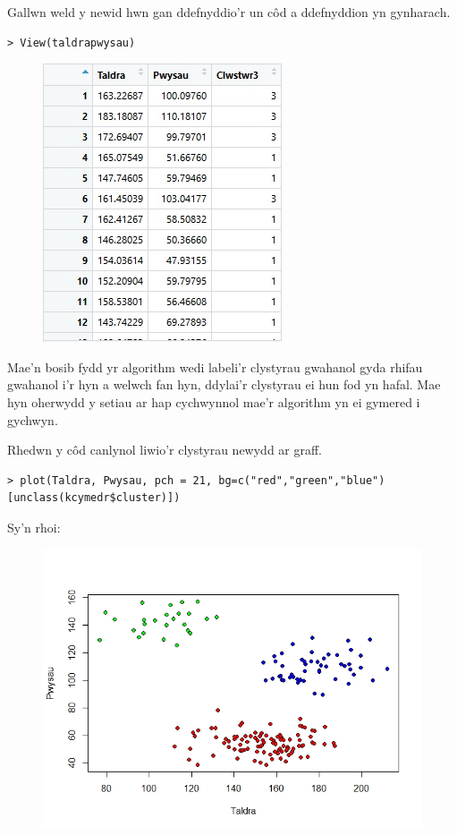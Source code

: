 Gallwn weld y newid hwn gan ddefnyddio'r un c\^{o}d a ddefnyddion yn gynharach.

\begin{verbatim}
> View(taldrapwysau)
\end{verbatim}

\begin{figure}[H]
\begin{center}
\includegraphics[width=0.5\linewidth]{../img/Data3_yn_R.jpg}
\end{center}
\end{figure}

Mae'n bosib fydd yr algorithm wedi labeli'r clystyrau gwahanol gyda rhifau gwahanol i'r hyn a welwch fan hyn, ddylai'r clystyrau ei hun fod yn hafal. Mae hyn oherwydd y setiau ar hap cychwynnol mae'r algorithm yn ei gymered i gychwyn.

Rhedwn y c\^{o}d canlynol liwio'r clystyrau newydd ar graff.

\begin{verbatim}
> plot(Taldra, Pwysau, pch = 21, bg=c("red","green","blue")[unclass(kcymedr$cluster)])
\end{verbatim}

Sy'n rhoi:

\begin{figure}[H]
\begin{center}
\includegraphics[width=0.5\linewidth]{../img/3clwstwrR.jpeg}
\end{center}
\end{figure}

